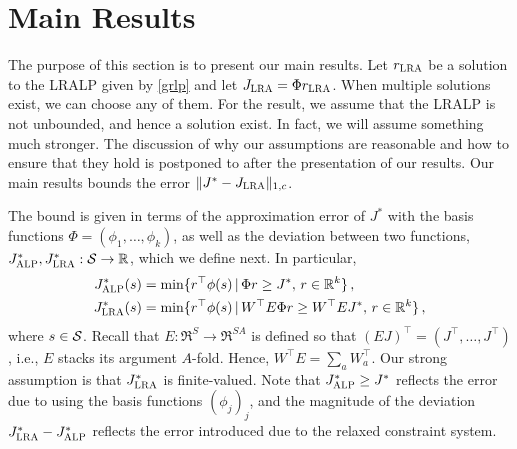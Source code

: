 \section{Main Results}


The purpose of this section is to present our main results.
\newcommand{\Jalpo}{J^*_{\alp}}
\newcommand{\Jlro}{J^*_{\lralpshort}}
\newcommand{\Jlr}{J_{\lralpshort}}
\newcommand{\rlr}{r_{\lralpshort}}
Let $\rlr$ be a solution to the LRALP given by \eqref{grlp}
and let $\Jlr = \Phi \rlr$. When multiple solutions exist, we can choose any of them.
For the result, we assume that the LRALP is not unbounded, and hence a solution exist. In fact, we will assume something much stronger. The discussion of why our assumptions are reasonable and how to ensure that they hold is postponed to after the presentation of our results.
Our main results bounds the error $\norm{J^* - \Jlr}_{1,c}$.

The bound is given in terms of the approximation error of $J^*$ with the basis functions $\Phi= (\phi_1,\dots,\phi_k)$, as well as the deviation between two functions, $\Jalpo,\Jlro: \S \to \Re$, which we define next. In particular,
\begin{align*}
\Jalpo(s) & = \min\{ r^\top\phi(s) \,|\, \Phi r \ge J^*, \, r\in \Re^k \}\,,\\
\Jlro(s)    & = \min\{ r^\top\phi(s) \,|\, W^\top E \Phi r \ge W^\top E J^*, \, r\in \Re^k \}\,,
\end{align*}
where $s\in \S$. Recall that $E: \Re^S \to \Re^{SA}$ is defined so that $(E J)^\top = (J^\top, \dots, J^\top)$, i.e., $E$ stacks its argument $A$-fold. Hence, $W^\top E = \sum_a W_a^\top$. Our strong assumption is that $\Jlro$ is finite-valued. Note that $\Jalpo\ge J^*$ reflects the error due to using the basis functions $(\phi_j)_j$, and the magnitude of the deviation $\Jlro-\Jalpo$ reflects the error introduced due to the relaxed constraint system. 

